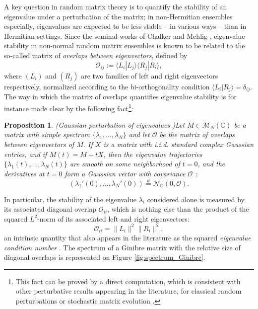 \documentclass[12pt,a4paper]{amsart}
\theoremstyle{plain} %
\newtheorem{proposition}[theorem]{Proposition}
\newcommand{\Ov}{\mathscr{O}}
\newcommand{\la}{\lambda}
\begin{document}
A key question in random matrix theory is to quantify the stability of an eigenvalue under a perturbation of the matrix; in non-Hermitian ensembles especially, eigenvalues are expected to be less stable -- in various ways -- than in Hermitian settings. Since the seminal works of Chalker and Mehlig \cites{ChalkerMehlig, MehligChalker1, MehligChalker2}, eigenvalue stability in non-normal random matrix ensembles is known to be related to the so-called matrix of \textit{overlaps between eigenvectors}, defined by
\begin{equation}\label{def_overlaps}
    \Ov_{ij} := \langle L_i | L_j \rangle \langle R_j | R_i \rangle,
\end{equation}
where $(L_i)$ and $(R_j)$ are two families of left and right eigenvectors respectively, normalized according to the bi-orthogonality condition $\langle L_i | R_j \rangle = \delta_{ij}$. 
The way in which the matrix of overlaps quantifies eigenvalue stability is for instance made clear by the following fact\footnote{This fact can be proved by a direct computation, which is consistent with other perturbative results appearing in the literature, for classical random perturbations \cites{ChalkerMehlig, MehligChalker1, MehligChalker2} or stochastic matrix evolution \cites{BourgadeDubach,GrelaWarchol}. }:

\begin{proposition}(Gaussian perturbation of eigenvalues \cite{Thomas2026})\label{prop1}
Let $M \in \mathcal{M}_N(\mathbb{C})$ be a matrix with simple spectrum $\{ \la_1, \dots, \la_N \}$ and let $\Ov$ be the matrix of overlaps between eigenvectors of $M$. If $X$ is a matrix with i.i.d. standard complex Gaussian entries, and if $M(t) = M+ t X$, then the eigenvalue trajectories $\{ \la_1(t), \dots, \la_N(t) \}$ are smooth on some neighborhood of $t=0$, and the derivatives at $t=0$ form a Gaussian vector with covariance $\Ov$ : 
    $$ (\lambda_1'(0), ..., \lambda_N'(0)) \overset{d}{=} \mathcal{N}_{\mathbb{C}}(0, \Ov).$$
\end{proposition}

In particular, the stability of the eigenvalue $\la_i$ considered alone is measured by its associated diagonal overlap $\Ov_{ii}$, which is nothing else than the product of the squared $L^2$-norm of its associated left and right eigenvectors:
$$
\Ov_{ii} = \| L_i \|^2 \| R_i \|^2,
$$
an intrinsic quantity that also appears in the literature as the squared \textit{eigenvalue condition number} \cites{Belinschi2017}.
The spectrum of a Ginibre matrix with the relative size of diagonal overlaps is represented on Figure \ref{fig:spectrum_Ginibre}.
\end{document}
